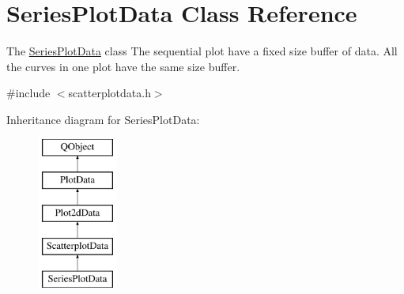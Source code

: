 \hypertarget{class_series_plot_data}{\section{Series\-Plot\-Data Class Reference}
\label{class_series_plot_data}
}


The \hyperlink{class_series_plot_data}{Series\-Plot\-Data} class The sequential plot have a fixed size buffer of data. All the curves in one plot have the same size buffer.  




{\ttfamily \#include $<$scatterplotdata.\-h$>$}

Inheritance diagram for Series\-Plot\-Data\-:\begin{figure}[H]
\begin{center}
\leavevmode
\includegraphics[height=5.000000cm]{class_series_plot_data}
\end{center}
\end{figure}
